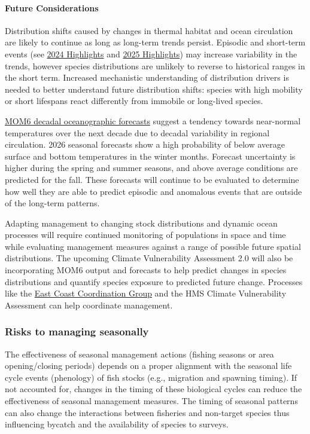\documentclass[
  10pt,
]{article}
\begin{document}
\paragraph{Future Considerations}\label{future-considerations}

Distribution shifts caused by changes in thermal habitat and ocean
circulation are likely to continue as long as long-term trends persist.
Episodic and short-term events (see
\href{https://noaa-edab.github.io/catalog/observation_synthesis_2024.html}{2024
Highlights} and \hyperref[highlights]{2025 Highlights}) may increase
variability in the trends, however species distributions are unlikely to
reverse to historical ranges in the short term. Increased mechanistic
understanding of distribution drivers is needed to better understand
future distribution shifts: species with high mobility or short
lifespans react differently from immobile or long-lived species.

\href{https://noaa-edab.github.io/catalog/MOM6_forecasts.html}{MOM6
decadal oceanographic forecasts} suggest a tendency towards near-normal
temperatures over the next decade due to decadal variability in regional
circulation. 2026 seasonal forecasts show a high probability of below
average surface and bottom temperatures in the winter months. Forecast
uncertainty is higher during the spring and summer seasons, and above
average conditions are predicted for the fall. These forecasts will
continue to be evaluated to determine how well they are able to predict
episodic and anomalous events that are outside of the long-term
patterns.

Adapting management to changing stock distributions and dynamic ocean
processes will require continued monitoring of populations in space and
time while evaluating management measures against a range of possible
future spatial distributions. The upcoming Climate Vulnerability
Assessment 2.0 will also be incorporating MOM6 output and forecasts to
help predict changes in species distributions and quantify species
exposure to predicted future change. Processes like the
\href{https://www.mafmc.org/e3cg}{East Coast Coordination Group} and the
HMS Climate Vulnerability Assessment can help coordinate management.

\subsubsection{Risks to managing
seasonally}\label{risks-to-managing-seasonally}

The effectiveness of seasonal management actions (fishing seasons or
area opening/closing periods) depends on a proper alignment with the
seasonal life cycle events (phenology) of fish stocks (e.g., migration
and spawning timing). If not accounted for, changes in the timing of
these biological cycles can reduce the effectiveness of seasonal
management measures. The timing of seasonal patterns can also change the
interactions between fisheries and non-target species thus influencing
bycatch and the availability of species to surveys.
\end{document}

